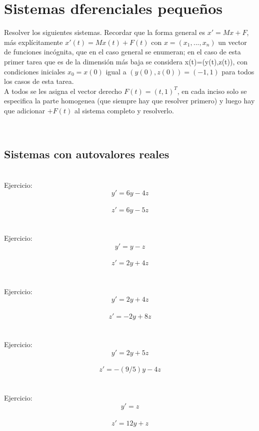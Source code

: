 \documentclass{article}
\begin{document}
    \section{Sistemas dferenciales pequeños}
    Resolver los siguientes sistemas.
    Recordar que la forma general es \( x'=Mx+F \), más explícitamente \( x'(t)=Mx(t)+F(t) \)
    con \( x=(x_1,...,x_n) \) un vector de funciones incógnita, que en el caso general se enumeran;
    en el caso de esta primer tarea que es de la dimensión más baja se considera x(t)=(y(t),z(t)), con 
    condiciones iniciales \( x_0 = x(0) \) igual a \( (y(0),z(0))=(-1,1)\) para todos los casos de esta tarea.\\
    A todos se les asigna el vector derecho \( F(t)=(t,1)^T \),
    en cada inciso solo se especifica la parte homogenea (que siempre hay que resolver primero) y luego
    hay que adicionar \( +F(t) \) al sistema completo y resolverlo.

\ \\

\subsection{Sistemas con autovalores reales}

\ \\ Ejercicio:  $$ y'=6y-4z $$\\
      $$ z'= 6y-5z $$\\

\ \\ Ejercicio:  $$ y'=y-z $$\\
      $$ z'= 2y+4z $$\\



\ \\ Ejercicio:  $$ y'= 2y+4z$$\\
      $$ z'= -2y+8z$$\\%


\ \\ Ejercicio:  $$ y'= 2y+5z$$\\
      $$ z'= -(9/5)y-4z$$\\%


\ \\ Ejercicio:  $$y'=z$$\\
      $$z'=12y+z$$\\
\end{document}
